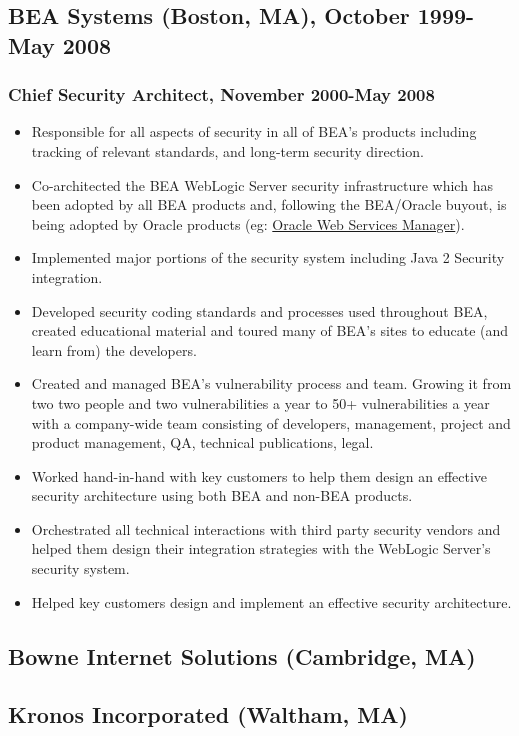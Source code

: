 \documentclass[11pt]{article}
\begin{document}
\subsection*{BEA Systems (Boston, MA), October 1999-May 2008}
\label{sec-4-3}
\subsubsection*{Chief Security Architect, November 2000-May 2008}
\label{sec-4-3-1}

\begin{itemize}
\item Responsible for all aspects of security in all of BEA’s products including tracking of relevant standards, and long-term security direction.
\item Co-architected the BEA WebLogic Server security infrastructure which has been adopted by all BEA products and, following the BEA/Oracle buyout, is being adopted by Oracle products (eg: \href{http://docs.oracle.com/cd/E21764_01/web.1111/b32511/intro_ws.htm#autoId0}{Oracle Web Services Manager}).
\item Implemented major portions of the security system including Java 2 Security integration.
\item Developed security coding standards and processes used throughout BEA, created educational material and toured many of BEA's sites to educate (and learn from) the developers.
\item Created and managed BEA's vulnerability process and team. Growing it from two two people and two vulnerabilities a year to 50+ vulnerabilities a year with a company-wide team consisting of developers, management, project and product management, QA, technical publications, legal.
\item Worked hand-in-hand with key customers to help them design an effective security architecture using both BEA and non-BEA products.
\item Orchestrated all technical interactions with third party security vendors and helped them design their integration strategies with the WebLogic Server's security system.
\item Helped key customers design and implement an effective security architecture.
\end{itemize}
\subsection*{Bowne Internet Solutions (Cambridge, MA)}
\label{sec-4-4}
\subsection*{Kronos Incorporated (Waltham, MA)}
\label{sec-4-5}
\end{document}
